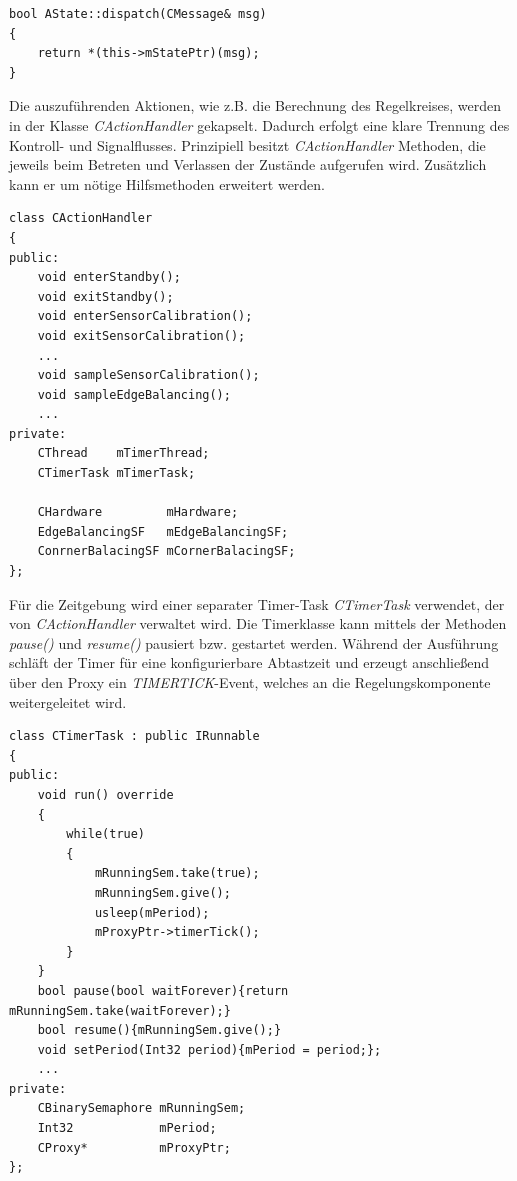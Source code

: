 \begin{lstlisting}[caption={Defintion der \textit{dispatch()}-Methode},captionpos=b]
bool AState::dispatch(CMessage& msg)
{
	return *(this->mStatePtr)(msg);
}
\end{lstlisting} 

Die auszuführenden Aktionen, wie z.B. die Berechnung des Regelkreises, werden in der Klasse \textit{CActionHandler} gekapselt. Dadurch erfolgt eine klare Trennung des Kontroll- und Signalflusses. Prinzipiell besitzt \textit{CActionHandler} Methoden, die jeweils beim Betreten und Verlassen der Zustände aufgerufen wird. Zusätzlich kann er um nötige Hilfsmethoden erweitert werden.
\begin{lstlisting}[caption={Beispielhafte Implementierung des Actionhandlers},captionpos=b]
class CActionHandler
{
public:
	void enterStandby();
	void exitStandby();
	void enterSensorCalibration();
	void exitSensorCalibration();
	...
	void sampleSensorCalibration();
	void sampleEdgeBalancing();
	...
private:
	CThread    mTimerThread;
	CTimerTask mTimerTask;
	
	CHardware         mHardware;
	EdgeBalancingSF   mEdgeBalancingSF;
	ConrnerBalacingSF mCornerBalacingSF;
};
\end{lstlisting}
Für die Zeitgebung wird einer separater Timer-Task \textit{CTimerTask} verwendet, der von \textit{CActionHandler} verwaltet wird. Die Timerklasse kann mittels der Methoden \textit{pause()} und \textit{resume()} pausiert bzw. gestartet werden. Während der Ausführung schläft der Timer für eine konfigurierbare Abtastzeit und erzeugt anschließend über den Proxy ein \textit{TIMERTICK}-Event, welches an die Regelungskomponente weitergeleitet wird.
\begin{lstlisting}[caption={Implementierung des Timer-Tasks},captionpos=b]
class CTimerTask : public IRunnable
{
public:
	void run() override
	{
		while(true)
		{
			mRunningSem.take(true);
			mRunningSem.give();
			usleep(mPeriod);
			mProxyPtr->timerTick();
		}
	}
	bool pause(bool waitForever){return mRunningSem.take(waitForever);}
	bool resume(){mRunningSem.give();}
	void setPeriod(Int32 period){mPeriod = period;};
	...
private:
	CBinarySemaphore mRunningSem;
	Int32            mPeriod;
	CProxy*          mProxyPtr;
};
\end{lstlisting}
